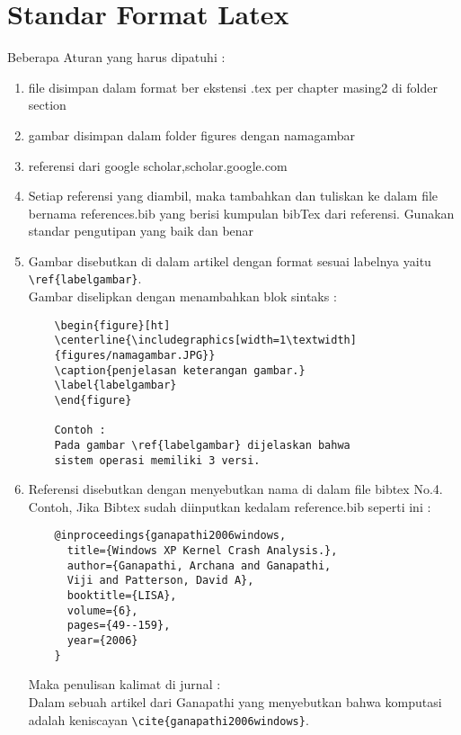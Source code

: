 \section{Standar Format Latex}
Beberapa Aturan yang harus dipatuhi :
\begin{enumerate}

    \item file disimpan dalam format ber ekstensi .tex per chapter masing2 di folder section

    \item gambar disimpan dalam folder figures dengan namagambar

    \item referensi dari google scholar,scholar.google.com

    \item Setiap referensi yang diambil, maka tambahkan dan tuliskan ke dalam file bernama references.bib yang berisi kumpulan bibTex dari referensi. Gunakan standar pengutipan yang baik dan benar

    \item Gambar disebutkan di dalam artikel dengan format sesuai labelnya yaitu \\ \verb|\ref{labelgambar}|. \\ Gambar diselipkan dengan menambahkan blok sintaks :
    \begin{verbatim}
    \begin{figure}[ht]
    \centerline{\includegraphics[width=1\textwidth]
    {figures/namagambar.JPG}}
    \caption{penjelasan keterangan gambar.}
    \label{labelgambar}
    \end{figure}
    
    Contoh :
    Pada gambar \ref{labelgambar} dijelaskan bahwa 
    sistem operasi memiliki 3 versi.
    \end{verbatim}

    \item Referensi disebutkan dengan menyebutkan nama di dalam file bibtex No.4. \\
    Contoh, Jika Bibtex sudah diinputkan kedalam reference.bib seperti ini :
    \begin{verbatim}
    @inproceedings{ganapathi2006windows,
      title={Windows XP Kernel Crash Analysis.},
      author={Ganapathi, Archana and Ganapathi, 
      Viji and Patterson, David A},
      booktitle={LISA},
      volume={6},
      pages={49--159},
      year={2006}
    }
    \end{verbatim}
    Maka penulisan kalimat di jurnal : \\
    Dalam sebuah artikel dari Ganapathi yang 
    menyebutkan bahwa komputasi adalah keniscayan \verb|\cite{ganapathi2006windows}|.
    

\end{enumerate}

